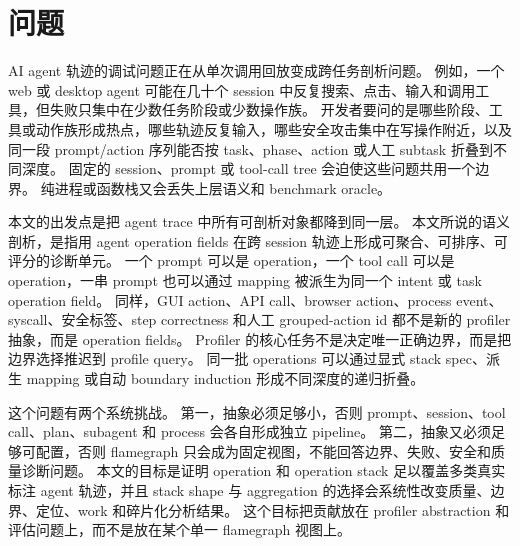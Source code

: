 \documentclass[10pt,twocolumn]{ctexart}
\begin{document}
\begin{abstract}
因此本文支持的是有范围限定的 profiling 主张：operation-stack profiling 能在公开真实标注 trace 的 dataset-provided hidden labels 下定位、排序和解释任务相关 failure、quality problem 和 dataset-provided semantic boundary，并相对 flat summary 减少 inspection work、相对 fixed-session drilldown proxy 改善 median fragmentation tradeoff。
本文不声称提升 human productivity，不声称自动发现所有 intent boundary，不声称 free-form prompt/LLM tagger 已完成同输入准确率验证，不声称 metric dominance，也不声称完整兼容现有 trace ecosystem。
\end{abstract}

\section{问题}

AI agent 轨迹的调试问题正在从单次调用回放变成跨任务剖析问题。
例如，一个 web 或 desktop agent 可能在几十个 session 中反复搜索、点击、输入和调用工具，但失败只集中在少数任务阶段或少数操作族。
开发者要问的是哪些阶段、工具或动作族形成热点，哪些轨迹反复输入，哪些安全攻击集中在写操作附近，以及同一段 prompt/action 序列能否按 task、phase、action 或人工 subtask 折叠到不同深度。
固定的 session、prompt 或 tool-call tree 会迫使这些问题共用一个边界。
纯进程或函数栈又会丢失上层语义和 benchmark oracle。

本文的出发点是把 agent trace 中所有可剖析对象都降到同一层。
本文所说的语义剖析，是指用 agent operation fields 在跨 session 轨迹上形成可聚合、可排序、可评分的诊断单元。
一个 prompt 可以是 operation，一个 tool call 可以是 operation，一串 prompt 也可以通过 mapping 被派生为同一个 intent 或 task operation field。
同样，GUI action、API call、browser action、process event、syscall、安全标签、step correctness 和人工 grouped-action id 都不是新的 profiler 抽象，而是 operation fields。
Profiler 的核心任务不是决定唯一正确边界，而是把边界选择推迟到 profile query。
同一批 operations 可以通过显式 stack spec、派生 mapping 或自动 boundary induction 形成不同深度的递归折叠。

这个问题有两个系统挑战。
第一，抽象必须足够小，否则 prompt、session、tool call、plan、subagent 和 process 会各自形成独立 pipeline。
第二，抽象又必须足够可配置，否则 flamegraph 只会成为固定视图，不能回答边界、失败、安全和质量诊断问题。
本文的目标是证明 operation 和 operation stack 足以覆盖多类真实标注 agent 轨迹，并且 stack shape 与 aggregation 的选择会系统性改变质量、边界、定位、work 和碎片化分析结果。
这个目标把贡献放在 profiler abstraction 和评估问题上，而不是放在某个单一 flamegraph 视图上。
\end{document}
